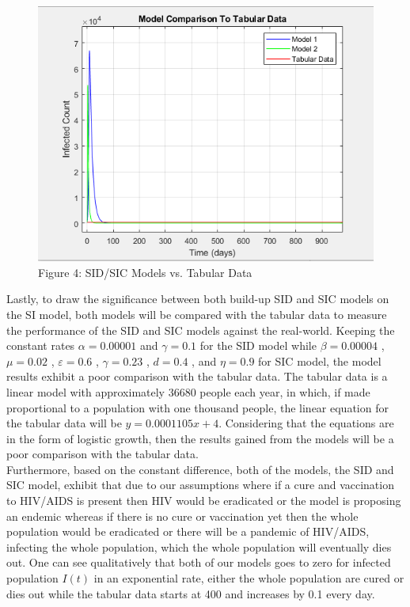 \documentclass[a4paper, final, 12pt]{article}
\numberwithin{equation}{section}
\newcommand{\eps}{\varepsilon}
\begin{document}
\begin{figure}[!ht] 
    \centering
    \includegraphics[width=.7\textwidth]{image (3).png}
    \caption{Figure 4: SID/SIC Models vs. Tabular Data}
    \label{fig:matrix3}
\end{figure}

Lastly, to draw the significance between both build-up SID and SIC models on the SI model, both models will be compared with the tabular data to measure the performance of the SID and SIC models against the real-world. Keeping the constant rates $\alpha = 0.00001$ and $\gamma = 0.1$ for the SID model while $\beta = 0.00004$ , $\mu = 0.02$ , $\eps = 0.6$ , $\gamma = 0.23$ , $d = 0.4$ , and $\eta = 0.9$ for SIC model, the model results exhibit a poor comparison with the tabular data. The tabular data is a linear model with approximately 36680 people each year, in which, if made proportional to a population with one thousand people, the linear equation for the tabular data will be $y = 0.0001105x + 4$. Considering that the equations are in the form of logistic growth, then the results gained from the models will be a poor comparison with the tabular data. \\

Furthermore, based on the constant difference, both of the models, the SID and SIC model, exhibit that due to our assumptions where if a cure and vaccination to HIV/AIDS is present then HIV would be eradicated or the model is proposing an endemic whereas if there is no cure or vaccination yet then the whole population would be eradicated or there will be a pandemic of HIV/AIDS, infecting the whole population, which the whole population will eventually dies out. One can see qualitatively that both of our models goes to zero for infected population $I(t)$ in an exponential rate, either the whole population are cured or dies out while the tabular data starts at 400 and increases by 0.1 every day. \\
\end{document}
